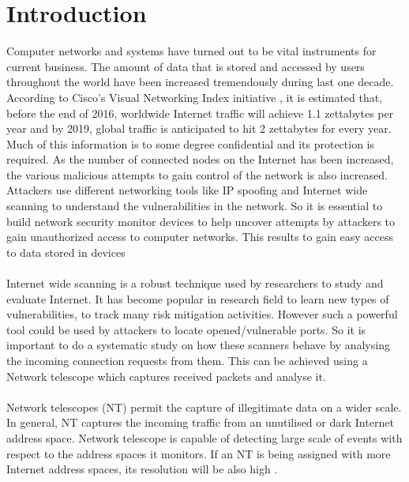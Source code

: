\chapter{Introduction}
Computer networks and systems have turned out to be vital instruments for current business.
The amount of data that is stored and accessed by users throughout the world have been increased tremendously during last one decade.
According to Cisco's Visual Networking Index initiative \cite{cisco}, it is estimated that, before the end of 2016, worldwide Internet traffic will achieve 1.1 zettabytes per year and by 2019, global traffic is anticipated to hit 2 zettabytes for every year.
Much of this information is to some degree confidential and its protection is required.
As the number of connected nodes on the Internet has been increased, the various malicious attempts to gain control of the network is also increased.
Attackers use different networking tools like IP spoofing and Internet wide scanning to understand the vulnerabilities in the network.
So it is essential to build network security monitor devices to help uncover attempts by attackers to gain unauthorized access to computer networks.
This results to gain easy access to data stored in devices\\\\
Internet wide scanning is a robust technique used by researchers to study and evaluate Internet.
It has become popular in research field to learn new types of vulnerabilities, to track many risk mitigation activities.
However such a powerful tool could be used by attackers to locate  opened/vulnerable ports.
So it is important to do a systematic study on how these scanners behave by analysing the incoming connection requests from them.
This can be achieved using a Network telescope \cite{caida} which captures received packets and analyse it.\\\\
Network telescopes (NT) permit the capture of illegitimate data on a wider scale.
In general, NT captures the incoming traffic from an unutilised or dark Internet address space.
Network telescope is capable of detecting large scale of events with respect to the address spaces it monitors.
If an NT is being assigned with more Internet address spaces, its resolution will be also high \cite{irvin}.


	
